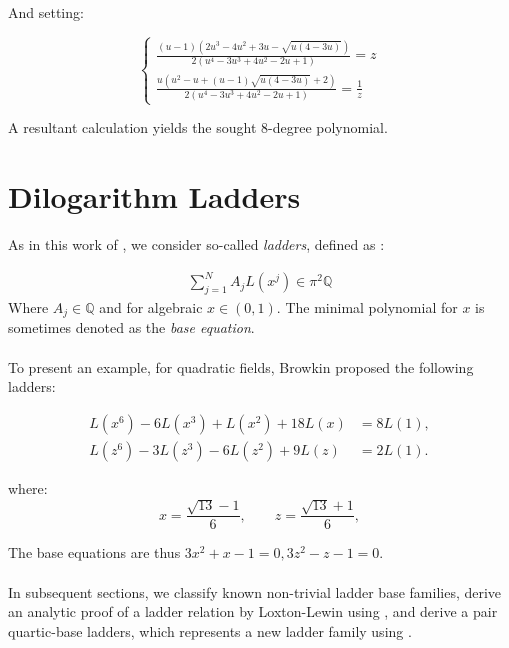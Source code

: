 \documentclass[12pt]{article}
\begin{document}
And setting:

\begin{equation*}
\left\{
\begin{aligned}
\frac{(u-1) \left(2 u^3 - 4 u^2 + 3 u - \sqrt{u(4 - 3 u)}\right)}{2 \left(u^4 - 3 u^3 + 4 u^2 - 2 u + 1\right)} = z\\
\frac{u \left(u^2 - u + (u-1) \sqrt{u(4-3u)} + 2\right)}{2 \left(u^4 - 3 u^3 + 4 u^2 - 2 u + 1\right)} = \frac{1}{z}
\end{aligned}
\right.
\end{equation*}

\noindent A resultant calculation yields the sought 8-degree polynomial. 

\section{Dilogarithm Ladders}
As in this work  of \cite{Lewin1958,AbouzahraLewinXiao1987,Lewin1986,Lewin1981,Lewin1991text,Lewin1993,Lewin1991collection,CohenLewinZagier1992,Gangl2013}, we consider so-called \emph{ladders}, defined as :

\begin{equation}
\begin{aligned}
\sum_{j=1}^N A_jL(x^j) \in \pi^2 \mathbb{Q} 
\end{aligned}
\end{equation}
\noindent Where $A_j \in\mathbb{Q}$ and for algebraic $x \in (0,1)$. The minimal polynomial for $x$ is sometimes denoted as the \textit{base equation}.  
\\
\\
\noindent To present an example, for quadratic fields, Browkin \cite{Brow} proposed the following ladders:

\begin{align*}
L(x^{6})-6L(x^{3})+L(x^{2})+18L(x)
    &= 8L(1),  \\
L(z^{6})-3L(z^{3})-6L(z^{2})+9L(z)
    &= 2L(1). 
\end{align*}

\noindent where:
\[
x=\frac{\sqrt{13}-1}{6},
\qquad
z=\frac{\sqrt{13}+1}{6},
\]

\noindent The base equations are thus $3 x^2 + x - 1=0, 3 z^2 - z - 1=0$.
\\
\\
\noindent In subsequent sections, we classify  known non-trivial ladder base families, derive an analytic proof of a  ladder relation by Loxton-Lewin using , and derive a pair quartic-base  ladders, which represents a new ladder family using . 
\end{document}
